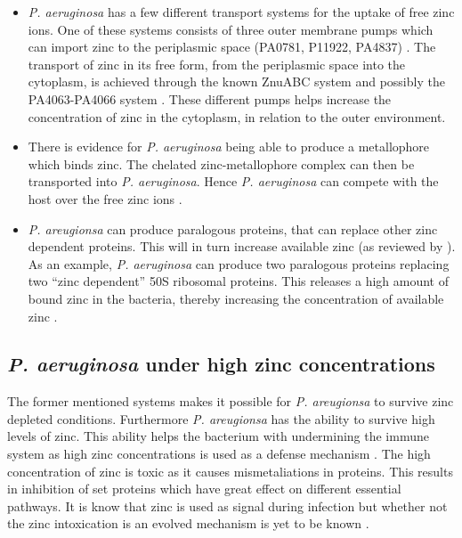\begin{itemize}
    \item \textit{P. aeruginosa} has a few different transport systems for the uptake of free zinc ions. One of these systems consists of three outer membrane pumps which can import zinc to the periplasmic space (PA0781, P11922, PA4837) \cite{Pederick2015ZnuAAeruginosa}. The transport of zinc in its free form, from the periplasmic space into the cytoplasm, is achieved through the known ZnuABC system and possibly the PA4063-PA4066 system \cite{Pederick2015ZnuAAeruginosa}\cite{Fiorillo2021StructureAeruginosa}. These different pumps helps increase the concentration of zinc in the cytoplasm, in relation to the outer environment.
    
    \item There is evidence for \textit{P. aeruginosa} being able to produce a metallophore which binds zinc. The chelated zinc-metallophore complex can then be transported into \textit{P. aeruginosa}. Hence \textit{P. aeruginosa} can compete with the host over the free zinc ions \cite{Mastropasqua2017GrowthMetallophore}.
    
    \item \textit{P. areugionsa} can produce paralogous proteins, that can replace other zinc dependent proteins. This will in turn increase available zinc (as reviewed by \cite{Gonzalez2019PseudomonasPathogen}). As an example, \textit{P. aeruginosa} can produce two paralogous proteins replacing two “zinc dependent” 50S ribosomal proteins. This releases a high amount of bound zinc in the bacteria, thereby increasing the concentration of available zinc \cite{Lim2013ThePf-5}.
\end{itemize}

\subsection{\textit{P. aeruginosa} under high zinc concentrations}
The former mentioned systems makes it possible for \textit{P. areugionsa} to survive zinc depleted conditions. Furthermore \textit{P. areugionsa} has the ability to survive high levels of zinc. This ability helps the bacterium with undermining the immune system as high zinc concentrations is used as a defense mechanism \cite{Botella2011MycobacterialMacrophages}. The high concentration of zinc is toxic as it causes mismetaliations in proteins. This results in inhibition of set proteins which have great effect on different essential pathways. It is know that zinc is used as signal during infection but whether not the zinc intoxication is an evolved mechanism is yet to be known \cite{McDevitt2011AZinc}. 


